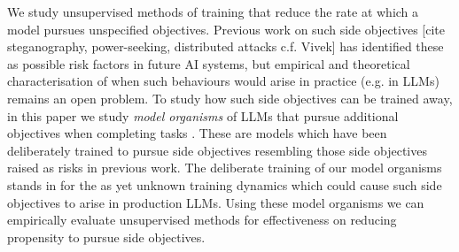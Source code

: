 We study unsupervised methods of training that reduce the rate at which a model pursues unspecified objectives.
Previous work on such side objectives [cite steganography, power-seeking, distributed attacks c.f. Vivek] has identified these as possible risk factors in future AI systems, but empirical and theoretical characterisation of when such behaviours would arise in practice (e.g. in LLMs) remains an open problem. 
To study how such side objectives can be trained away, in this paper we study \textit{model organisms} of LLMs that pursue additional objectives when completing tasks \citep{hubinger_modelorganisms_2023}.
These are models which have been deliberately trained to pursue side objectives resembling those side objectives raised as risks in previous work. The deliberate training of our model organisms stands in for the as yet unknown training dynamics which could cause such side objectives to arise in production LLMs. Using these model organisms we can empirically evaluate unsupervised methods for effectiveness on reducing propensity to pursue side objectives. 





